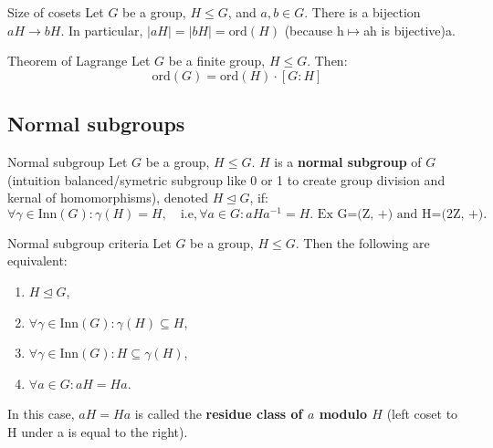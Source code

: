 \documentclass[a4paper]{article}
\begin{document}
\begin{ther}{Size of cosets}
Let $G$ be a group, $H \le G$, and $a,b \in G$. There is a bijection $aH \to bH$. In particular, $|aH| = |bH| = \text{ord}(H)$ (because h$\mapsto$ah is bijective)a.
\end{ther}

\begin{ther}{Theorem of Lagrange}
Let $G$ be a finite group, $H \le G$. Then:
$$\text{ord}(G) = \text{ord}(H) \cdot [G : H]$$
\end{ther}

\subsection*{Normal subgroups}

\begin{defi}{Normal subgroup}
Let $G$ be a group, $H \le G$. $H$ is a \textbf{normal subgroup} of $G$ (intuition balanced/symetric subgroup like 0 or 1 to create group division and kernal of homomorphisms), denoted $H \trianglelefteq G$, if:
$$\forall \gamma \in \text{Inn}(G) : \gamma(H) = H, \quad \text{i.e}, \forall a \in G : aHa^{-1} = H \text{. Ex G=(Z, +) and H=(2Z, +)}.$$
\end{defi}

\begin{ther}{Normal subgroup criteria}
Let $G$ be a group, $H \le G$. Then the following are equivalent:
\begin{enumerate}[label=(\roman*)]
    \item $H \trianglelefteq G$,
    \item $\forall \gamma \in \text{Inn}(G) : \gamma(H) \subseteq H$,
    \item $\forall \gamma \in \text{Inn}(G) : H \subseteq \gamma(H)$,
    \item $\forall a \in G : aH = Ha$.
\end{enumerate}
\end{ther}

\begin{add}
In this case, $aH = Ha$ is called the \textbf{residue class of $a$ modulo $H$} (left coset to H under a is equal to the right).
\end{add}
\end{document}
